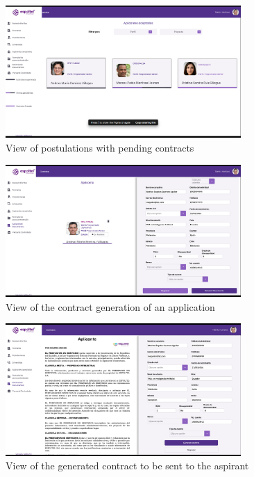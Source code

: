 \documentclass{scrreprt}
\begin{document}
\begin{figure}[H]
	\centering \small
	\includegraphics[width=0.8\textwidth]{WebPrototype/wflow-38.jpeg}
	\caption{View of postulations with pending contracts}
\end{figure}

\begin{figure}[H]
	\centering \small
	\includegraphics[width=0.8\textwidth]{WebPrototype/wflow-39.jpeg}
	\caption{View of the contract generation of an application}
\end{figure}

\begin{figure}[H]
	\centering \small
	\includegraphics[width=0.8\textwidth]{WebPrototype/wflow-40.jpeg}
	\caption{View of the generated contract to be sent to the aspirant}
\end{figure}
\end{document}
